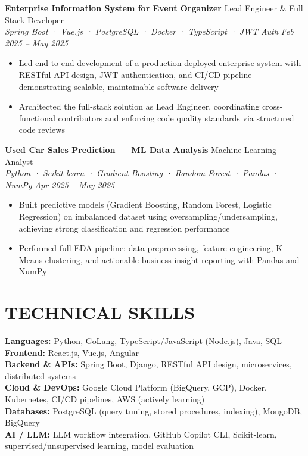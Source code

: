 \documentclass[10pt,a4paper]{article}
\newcommand{\experienceheader}[4]{
    \textbf{#1} \hfill #2 \\
    \textit{#3} \hfill \textit{#4}
}
\begin{document}
\experienceheader{Enterprise Information System for Event Organizer}{Lead Engineer \& Full Stack Developer}{Spring Boot · Vue.js · PostgreSQL · Docker · TypeScript · JWT Auth}{Feb 2025 -- May 2025}
\begin{itemize}[leftmargin=*, itemsep=0.5pt, topsep=0.5pt]
    \item Led end-to-end development of a production-deployed enterprise system with RESTful API design, JWT authentication, and CI/CD pipeline — demonstrating scalable, maintainable software delivery
    \item Architected the full-stack solution as Lead Engineer, coordinating cross-functional contributors and enforcing code quality standards via structured code reviews
\end{itemize}

\vspace{1pt}

\experienceheader{Used Car Sales Prediction — ML Data Analysis}{Machine Learning Analyst}{Python · Scikit-learn · Gradient Boosting · Random Forest · Pandas · NumPy}{Apr 2025 -- May 2025}
\begin{itemize}[leftmargin=*, itemsep=0.5pt, topsep=0.5pt]
    \item Built predictive models (Gradient Boosting, Random Forest, Logistic Regression) on imbalanced dataset using oversampling/undersampling, achieving strong classification and regression performance
    \item Performed full EDA pipeline: data preprocessing, feature engineering, K-Means clustering, and actionable business-insight reporting with Pandas and NumPy
\end{itemize}

\vspace{-3pt}

\section*{TECHNICAL SKILLS}

\textbf{Languages:} Python, GoLang, TypeScript/JavaScript (Node.js), Java, SQL \\
\textbf{Frontend:} React.js, Vue.js, Angular \\
\textbf{Backend \& APIs:} Spring Boot, Django, RESTful API design, microservices, distributed systems \\
\textbf{Cloud \& DevOps:} Google Cloud Platform (BigQuery, GCP), Docker, Kubernetes, CI/CD pipelines, AWS (actively learning) \\
\textbf{Databases:} PostgreSQL (query tuning, stored procedures, indexing), MongoDB, BigQuery \\
\textbf{AI / LLM:} LLM workflow integration, GitHub Copilot CLI, Scikit-learn, supervised/unsupervised learning, model evaluation
\end{document}
